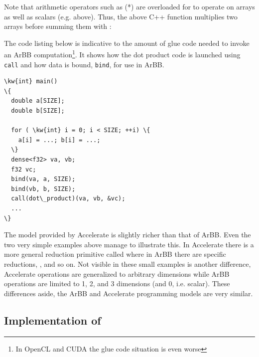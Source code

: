 
Note that arithmetic operators such as (*) are overloaded 
for to operate on arrays as well as scalars (e.g.  above).
Thus, the above C++ function multiplies two arrays before summing them with :

The code listing below is indicative to the amount of glue code needed to invoke an 
ArBB computation\footnote{In OpenCL and CUDA the glue code situation is even worse}. It shows how the dot product code is launched using {\tt call} and 
how data is bound, {\tt bind}, for use in ArBB. 

\vspace{2mm}
\begin{Verbatim}[commandchars=\\\{\}]
\kw{int} main() 
\{ 
  double a[SIZE];
  double b[SIZE];

  for ( \kw{int} i = 0; i < SIZE; ++i) \{ 
    a[i] = ...; b[i] = ...;
  \}
  dense<f32> va, vb;
  f32 vc;
  bind(va, a, SIZE); 
  bind(vb, b, SIZE); 
  call(dot\_product)(va, vb, &vc); 
  ...
\}
\end{Verbatim}



The model provided by Accelerate is slightly richer than that of ArBB.
Even the two very simple  examples above manage to illustrate 
this. In Accelerate there is a more general reduction primitive called  
where in ArBB there are specific reductions, ,  
and so on. Not visible in these small examples is another difference, Accelerate 
operations are generalized to arbitrary dimensions while ArBB operations are 
limited to 1, 2, and 3 dimensions (and 0, i.e. scalar). These differences aside,
the ArBB and Accelerate programming models are very similar.


\subsection{Implementation of \systemname{}} 


